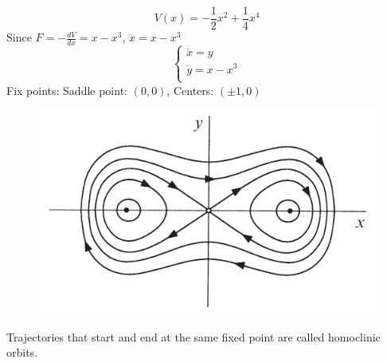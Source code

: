 \documentclass[9pt,aspectratio=43,mathserif,table]{beamer}
\begin{document}
\begin{frame}
	$$
	V(x)=-\frac{1}{2}x^2+\frac{1}{4}x^4
	$$
	Since $F=-\frac{dV}{dx}=x-x^3$, $\ddot{x}=x-x^3$
	$$
	\begin{cases}
		\dot{x}=y\\
		\dot{y}=x-x^3\\
	\end{cases}
	$$
	Fix points: Saddle point: $(0,0)$, Centers: $(\pm 1,0)$

	\begin{figure}
		\centering
		\includegraphics[width=0.4\linewidth]{fig651.png}
	\end{figure}	
	Trajectories that start and end at the same fixed point are called homoclinic orbits.
\end{frame}
\end{document}
